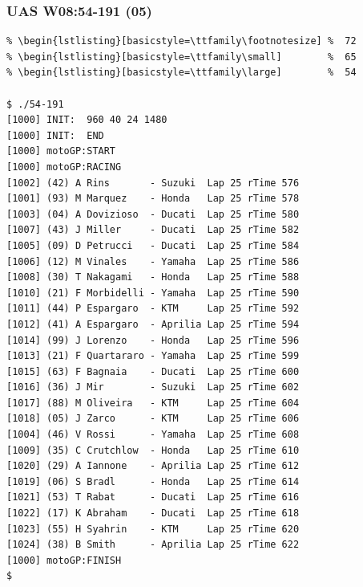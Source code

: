 \documentclass[xcolor=table, notheorems, hyperref={pdfpagelabels=false}]{beamer}
\begin{document}
\begin{frame}[fragile]
\frametitle{UAS W08:54-191 (05)}
\begin{lstlisting}[basicstyle=\ttfamily\tiny]         % 108
% \begin{lstlisting}[basicstyle=\ttfamily\tiny]         % 108
% \begin{lstlisting}[basicstyle=\ttfamily\footnotesize] %  72
% \begin{lstlisting}[basicstyle=\ttfamily\small]        %  65
% \begin{lstlisting}[basicstyle=\ttfamily\large]        %  54

$ ./54-191 
[1000] INIT:  960 40 24 1480
[1000] INIT:  END
[1000] motoGP:START
[1000] motoGP:RACING
[1002] (42) A Rins       - Suzuki  Lap 25 rTime 576
[1001] (93) M Marquez    - Honda   Lap 25 rTime 578
[1003] (04) A Dovizioso  - Ducati  Lap 25 rTime 580
[1007] (43) J Miller     - Ducati  Lap 25 rTime 582
[1005] (09) D Petrucci   - Ducati  Lap 25 rTime 584
[1006] (12) M Vinales    - Yamaha  Lap 25 rTime 586
[1008] (30) T Nakagami   - Honda   Lap 25 rTime 588
[1010] (21) F Morbidelli - Yamaha  Lap 25 rTime 590
[1011] (44) P Espargaro  - KTM     Lap 25 rTime 592
[1012] (41) A Espargaro  - Aprilia Lap 25 rTime 594
[1014] (99) J Lorenzo    - Honda   Lap 25 rTime 596
[1013] (21) F Quartararo - Yamaha  Lap 25 rTime 599
[1015] (63) F Bagnaia    - Ducati  Lap 25 rTime 600
[1016] (36) J Mir        - Suzuki  Lap 25 rTime 602
[1017] (88) M Oliveira   - KTM     Lap 25 rTime 604
[1018] (05) J Zarco      - KTM     Lap 25 rTime 606
[1004] (46) V Rossi      - Yamaha  Lap 25 rTime 608
[1009] (35) C Crutchlow  - Honda   Lap 25 rTime 610
[1020] (29) A Iannone    - Aprilia Lap 25 rTime 612
[1019] (06) S Bradl      - Honda   Lap 25 rTime 614
[1021] (53) T Rabat      - Ducati  Lap 25 rTime 616
[1022] (17) K Abraham    - Ducati  Lap 25 rTime 618
[1023] (55) H Syahrin    - KTM     Lap 25 rTime 620
[1024] (38) B Smith      - Aprilia Lap 25 rTime 622
[1000] motoGP:FINISH
$

\end{lstlisting}
\end{frame}

\end{document}
